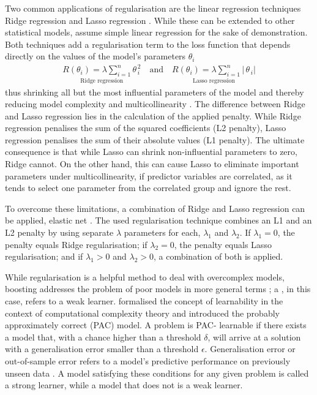 Two common applications of regularisation are the linear regression techniques 
Ridge regression \citep{Hoerl1970} and Lasso regression \citep{Tibshirani1996}.
While these can be extended to other statistical models, assume simple linear
regression for the sake of demonstration. Both techniques add a regularisation
term to the loss function that depends directly on the values of the model's
parameters $\theta_i$
\begin{align*}
  \underset{\text{Ridge regression}}{
    R\left(\theta_{i}\right)=\lambda\sum_{i=1}^{n}\theta_{\,i}^{\,2}
  }
  \quad\text{and}\quad
  \underset{\text{Lasso regression}}{
    R\left(\theta_{i}\right)=\lambda\sum_{i=1}^{n}\left|\,\theta_{\,i}\right|
  }
\end{align*}
thus shrinking all but the most influential parameters of the model and 
thereby reducing model complexity and multicollinearity \citep{Herawati2018}. 
The difference between Ridge and Lasso regression lies in the calculation of 
the applied penalty. While Ridge regression penalises the sum of the squared 
coefficients (L2 penalty), Lasso regression penalises the sum of their 
absolute values (L1 penalty). The ultimate consequence is that while Lasso can 
shrink non-influential parameters to zero, Ridge cannot. On the other hand, 
this can cause Lasso to eliminate important parameters under 
multicollinearity, if predictor variables are correlated, as it tends to 
select one parameter from the correlated group and ignore the rest.

To overcome these limitations, a combination of Ridge and Lasso regression can 
be applied, elastic net \citep{Zou2005}. The used regularisation technique 
combines an L1 and an L2 penalty by using separate $\lambda$ parameters for 
each, $\lambda_{1}$ and $\lambda_{2}$. If $\lambda_{1}=0$, the penalty equals 
Ridge regularisation; if $\lambda_{2}=0$, the penalty equals Lasso 
regularisation; and if $\lambda_{1}>0$ and $\lambda_{2}>0$, a combination of 
both is applied.
\bigbreak

\noindent While \label{mar:boosting} regularisation is a 
helpful method to deal with overcomplex models, boosting addresses the problem 
of poor models in more general terms \citep{Freund1999}; a , 
in this case, refers to a weak learner. \citet{ Valiant} formalised the 
concept of learnability in the context of computational complexity theory and 
introduced the probably approximately correct (PAC) model. A problem is PAC-
learnable if there exists a model that, with a chance higher than a threshold
$\delta$, will arrive at a solution with a generalisation error smaller than a 
threshold $\epsilon$. Generalisation error or out-of-sample error refers to a 
model's predictive performance on previously unseen data \citep{Bousquet2004}. 
A model satisfying these conditions for any given problem is called a strong 
learner, while a model that does not is a weak learner.

